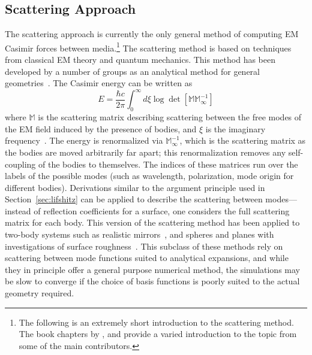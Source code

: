 \subsection{Scattering Approach}
\label{sec:scattering}
The scattering approach is currently the only general method of computing 
EM Casimir forces between media.\footnote{The following is an extremely short introduction to the scattering
method.  The book chapters by \citet{Lambrecht2011}, \citet{Rahi2011} and \citet{Johnson2011} 
provide a varied introduction to the topic from some of the main contributors.}
The scattering method is based on techniques from classical EM theory and quantum mechanics. %
This method has been developed by a number of groups as an analytical method for general geometries~\citep{Emig2004, Lambrecht2006,
Kenneth2006, Emig2007, MaiaNeto2008,Canaguier-Durand2012,Rahi2009}.  
The Casimir energy can be written as 
\begin{equation}
  E = \frac{\hbar c}{2\pi}\int_{0}^\infty d\xi \log\det[\mathbb{M}\mathbb{M}^{-1}_{\infty}]
  \label{eq:scattering}
\end{equation}
where $\mathbb{M}$ is the scattering matrix describing scattering between the free modes of the EM
field induced by the presence of bodies, and $\xi$ is the imaginary frequency~\citep{Rahi2009}.
The energy is renormalized via $\mathbb{M}^{-1}_\infty$,
which is the scattering matrix as the bodies are moved arbitrarily far apart; this renormalization removes any
self-coupling of the bodies to themselves. 
The indices of these matrices run over the labels of the possible modes (such as wavelength, polarization, mode origin for different bodies).
Derivations similar to the argument principle used in Section~\ref{sec:lifshitz} can be applied to describe the scattering 
between modes---instead of reflection coefficients for a surface, one considers the full scattering matrix for each body.
This version of the scattering method has been applied to two-body systems such as realistic mirrors~\citep{Lambrecht2006}, 
and spheres and planes with investigations of surface roughness~\citep{Canaguier-Durand2012}.   
This subclass of these methods rely on scattering between mode functions suited to analytical expansions,
 and while they in principle offer a general purpose numerical method, 
the simulations may be slow to converge if the choice of basis functions is poorly suited to the actual
geometry required.  

